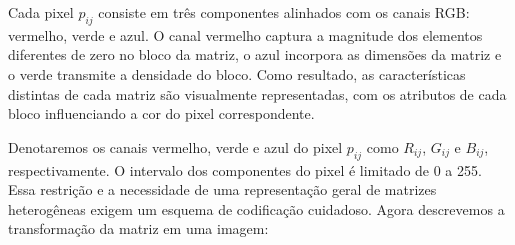 \documentclass{pssbmac}
\begin{document}
Cada pixel \( p_{ij} \) consiste em três componentes alinhados com os canais RGB: vermelho, verde e azul. 
O canal vermelho captura a magnitude dos elementos diferentes de zero no bloco da matriz, 
o azul incorpora as dimensões da matriz e o verde transmite a densidade do bloco. 
Como resultado, as características distintas de cada matriz são visualmente representadas, 
com os atributos de cada bloco influenciando a cor do pixel correspondente. 

Denotaremos os canais vermelho, verde e azul do pixel $p_{ij}$ como $R_{ij}$, $G_{ij}$ e $B_{ij}$, respectivamente. 
O intervalo dos componentes do pixel é limitado de 0 a 255. Essa restrição e a necessidade de 
uma representação geral de matrizes heterogêneas exigem um esquema de codificação cuidadoso. 
Agora descrevemos a transformação da matriz em uma imagem:
\end{document}
